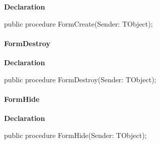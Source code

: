 \documentclass{report}
\newif\ifpdf
\begin{document}
\label{mnupdate.TUMnForm-FormCreate}
\begin{list}{}{
\setlength{\itemindent}{0cm}
\setlength{\listparindent}{0cm}
\setlength{\leftmargin}{\evensidemargin}
\addtolength{\leftmargin}{\tmplength}
\settowidth{\labelsep}{X}
\addtolength{\leftmargin}{\labelsep}
\setlength{\labelwidth}{\tmplength}
}
\item[\textbf{Declaration}\hfill]
\ifpdf
\begin{flushleft}
\fi
\begin{ttfamily}
public procedure FormCreate(Sender: TObject);\end{ttfamily}

\ifpdf
\end{flushleft}
\fi

\end{list}
\paragraph*{FormDestroy}\hspace*{\fill}

\label{mnupdate.TUMnForm-FormDestroy}
\begin{list}{}{
\setlength{\itemindent}{0cm}
\setlength{\listparindent}{0cm}
\setlength{\leftmargin}{\evensidemargin}
\addtolength{\leftmargin}{\tmplength}
\settowidth{\labelsep}{X}
\addtolength{\leftmargin}{\labelsep}
\setlength{\labelwidth}{\tmplength}
}
\item[\textbf{Declaration}\hfill]
\ifpdf
\begin{flushleft}
\fi
\begin{ttfamily}
public procedure FormDestroy(Sender: TObject);\end{ttfamily}

\ifpdf
\end{flushleft}
\fi

\end{list}
\paragraph*{FormHide}\hspace*{\fill}

\label{mnupdate.TUMnForm-FormHide}
\begin{list}{}{
\setlength{\itemindent}{0cm}
\setlength{\listparindent}{0cm}
\setlength{\leftmargin}{\evensidemargin}
\addtolength{\leftmargin}{\tmplength}
\settowidth{\labelsep}{X}
\addtolength{\leftmargin}{\labelsep}
\setlength{\labelwidth}{\tmplength}
}
\item[\textbf{Declaration}\hfill]
\ifpdf
\begin{flushleft}
\fi
\begin{ttfamily}
public procedure FormHide(Sender: TObject);\end{ttfamily}

\ifpdf
\end{flushleft}
\fi

\end{list}
\end{document}
